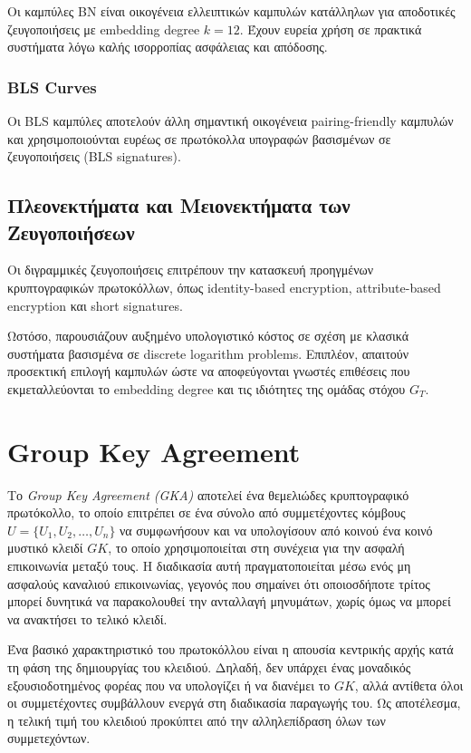 \documentclass[12pt,a4paper]{report}
\begin{document}
Οι καμπύλες BN είναι οικογένεια ελλειπτικών καμπυλών κατάλληλων για αποδοτικές ζευγοποιήσεις με embedding degree $k=12$. Έχουν ευρεία χρήση σε πρακτικά συστήματα λόγω καλής ισορροπίας ασφάλειας και απόδοσης.

\subsubsection*{BLS Curves}

Οι BLS καμπύλες αποτελούν άλλη σημαντική οικογένεια pairing-friendly καμπυλών και χρησιμοποιούνται ευρέως σε πρωτόκολλα υπογραφών βασισμένων σε ζευγοποιήσεις (BLS signatures).

\subsection{Πλεονεκτήματα και Μειονεκτήματα των Ζευγοποιήσεων}

Οι διγραμμικές ζευγοποιήσεις επιτρέπουν την κατασκευή προηγμένων κρυπτογραφικών πρωτοκόλλων, όπως identity-based encryption, attribute-based encryption και short signatures.

Ωστόσο, παρουσιάζουν αυξημένο υπολογιστικό κόστος σε σχέση με κλασικά συστήματα βασισμένα σε discrete logarithm problems. Επιπλέον, απαιτούν προσεκτική επιλογή καμπυλών ώστε να αποφεύγονται γνωστές επιθέσεις που εκμεταλλεύονται το embedding degree και τις ιδιότητες της ομάδας στόχου $G_T$.
\section{Group Key Agreement}

Το \textit{Group Key Agreement (GKA)} αποτελεί ένα θεμελιώδες κρυπτογραφικό πρωτόκολλο, το οποίο επιτρέπει σε ένα σύνολο από συμμετέχοντες κόμβους
$U = \{U_1, U_2, \dots, U_n\}$ να συμφωνήσουν και να υπολογίσουν από κοινού ένα κοινό μυστικό κλειδί $GK$, το οποίο χρησιμοποιείται στη συνέχεια για την ασφαλή επικοινωνία μεταξύ τους. Η διαδικασία αυτή πραγματοποιείται μέσω ενός μη ασφαλούς καναλιού επικοινωνίας, γεγονός που σημαίνει ότι οποιοσδήποτε τρίτος μπορεί δυνητικά να παρακολουθεί την ανταλλαγή μηνυμάτων, χωρίς όμως να μπορεί να ανακτήσει το τελικό κλειδί.

Ένα βασικό χαρακτηριστικό του πρωτοκόλλου είναι η απουσία κεντρικής αρχής κατά τη φάση της δημιουργίας του κλειδιού. Δηλαδή, δεν υπάρχει ένας μοναδικός εξουσιοδοτημένος φορέας που να υπολογίζει ή να διανέμει το $GK$, αλλά αντίθετα όλοι οι συμμετέχοντες συμβάλλουν ενεργά στη διαδικασία παραγωγής του. Ως αποτέλεσμα, η τελική τιμή του κλειδιού προκύπτει από την αλληλεπίδραση όλων των συμμετεχόντων.
\end{document}
